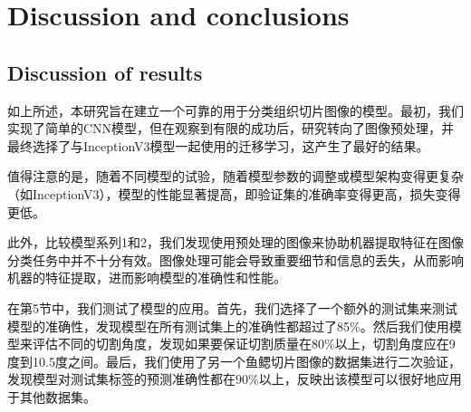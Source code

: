 \section{Discussion and conclusions}
\label{sec:results}

\subsection{Discussion of results}







如上所述，本研究旨在建立一个可靠的用于分类组织切片图像的模型。最初，我们实现了简单的CNN模型，但在观察到有限的成功后，研究转向了图像预处理，并最终选择了与InceptionV3模型一起使用的迁移学习，这产生了最好的结果。

值得注意的是，随着不同模型的试验，随着模型参数的调整或模型架构变得更复杂（如InceptionV3），模型的性能显著提高，即验证集的准确率变得更高，损失变得更低。

此外，比较模型系列1和2，我们发现使用预处理的图像来协助机器提取特征在图像分类任务中并不十分有效。图像处理可能会导致重要细节和信息的丢失，从而影响机器的特征提取，进而影响模型的准确性和性能。

在第5节中，我们测试了模型的应用。首先，我们选择了一个额外的测试集来测试模型的准确性，发现模型在所有测试集上的准确性都超过了85\%。然后我们使用模型来评估不同的切割角度，发现如果要保证切割质量在80\%以上，切割角度应在9度到10.5度之间。最后，我们使用了另一个鱼鳃切片图像的数据集进行二次验证，发现模型对测试集标签的预测准确性都在90\%以上，反映出该模型可以很好地应用于其他数据集。

